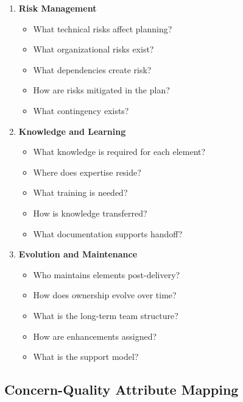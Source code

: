 \documentclass[11pt,letterpaper]{article}
\begin{document}
\begin{enumerate}[label=\textbf{C\arabic*:}, leftmargin=2.5em]
    \item \textbf{Risk Management}
    \begin{itemize}[nosep]
        \item What technical risks affect planning?
        \item What organizational risks exist?
        \item What dependencies create risk?
        \item How are risks mitigated in the plan?
        \item What contingency exists?
    \end{itemize}
    
    \item \textbf{Knowledge and Learning}
    \begin{itemize}[nosep]
        \item What knowledge is required for each element?
        \item Where does expertise reside?
        \item What training is needed?
        \item How is knowledge transferred?
        \item What documentation supports handoff?
    \end{itemize}
    
    \item \textbf{Evolution and Maintenance}
    \begin{itemize}[nosep]
        \item Who maintains elements post-delivery?
        \item How does ownership evolve over time?
        \item What is the long-term team structure?
        \item How are enhancements assigned?
        \item What is the support model?
    \end{itemize}
\end{enumerate}

\subsection{Concern-Quality Attribute Mapping}
\end{document}
